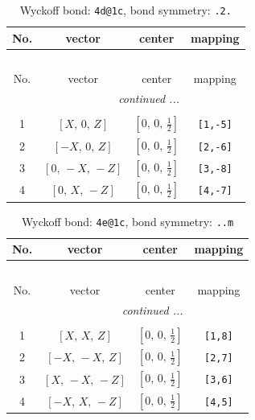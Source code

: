\documentclass[fleqn,8pt]{jsarticle}
\begin{document}
\begin{longtable}{cccc}
\caption{Wyckoff bond: {\tt 4d@1c}, bond symmetry: {\tt .2.}}
 \\
 \hline \hline
No. & vector & center & mapping \\ \hline \endfirsthead

\multicolumn{3}{l}{\tablename\ \thetable{}} \\
 \hline \hline
No. & vector & center & mapping \\ \hline \endhead

 \hline \hline
\multicolumn{3}{r}{\footnotesize\it continued ...} \\ \endfoot

 \hline \hline
\multicolumn{3}{r}{} \\ \endlastfoot

1 & $\left[ X,\, 0,\, Z \right]$ & $\left[ 0,\, 0,\, \frac{1}{2} \right]$ & {\tt [1,-5]} \\ \hline
2 & $\left[ - X,\, 0,\, Z \right]$ & $\left[ 0,\, 0,\, \frac{1}{2} \right]$ & {\tt [2,-6]} \\ \hline
3 & $\left[ 0,\, - X,\, - Z \right]$ & $\left[ 0,\, 0,\, \frac{1}{2} \right]$ & {\tt [3,-8]} \\ \hline
4 & $\left[ 0,\, X,\, - Z \right]$ & $\left[ 0,\, 0,\, \frac{1}{2} \right]$ & {\tt [4,-7]} \\
\end{longtable}
\renewcommand{\arraystretch}{1.2}
\begin{longtable}{cccc}
\caption{Wyckoff bond: {\tt 4e@1c}, bond symmetry: {\tt ..m}}
 \\
 \hline \hline
No. & vector & center & mapping \\ \hline \endfirsthead

\multicolumn{3}{l}{\tablename\ \thetable{}} \\
 \hline \hline
No. & vector & center & mapping \\ \hline \endhead

 \hline \hline
\multicolumn{3}{r}{\footnotesize\it continued ...} \\ \endfoot

 \hline \hline
\multicolumn{3}{r}{} \\ \endlastfoot

1 & $\left[ X,\, X,\, Z \right]$ & $\left[ 0,\, 0,\, \frac{1}{2} \right]$ & {\tt [1,8]} \\ \hline
2 & $\left[ - X,\, - X,\, Z \right]$ & $\left[ 0,\, 0,\, \frac{1}{2} \right]$ & {\tt [2,7]} \\ \hline
3 & $\left[ X,\, - X,\, - Z \right]$ & $\left[ 0,\, 0,\, \frac{1}{2} \right]$ & {\tt [3,6]} \\ \hline
4 & $\left[ - X,\, X,\, - Z \right]$ & $\left[ 0,\, 0,\, \frac{1}{2} \right]$ & {\tt [4,5]} \\
\end{longtable}
\end{document}
